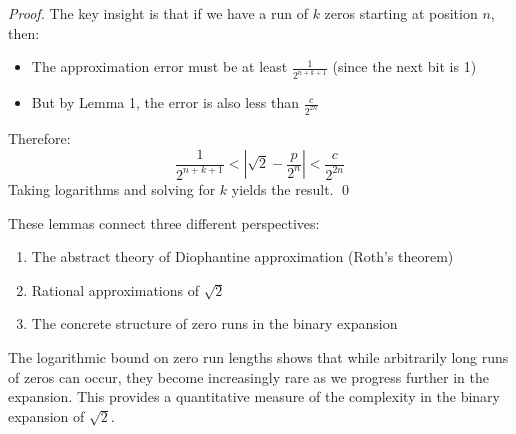 \textit{Proof.} The key insight is that if we have a run of $k$ zeros starting at position $n$, then:
\begin{itemize}
    \item The approximation error must be at least $\frac{1}{2^{n+k+1}}$ (since the next bit is 1)
    \item But by Lemma 1, the error is also less than $\frac{c}{2^{2n}}$
\end{itemize}
Therefore:
\[
\frac{1}{2^{n+k+1}} < \left|\sqrt{2} - \frac{p}{2^n}\right| < \frac{c}{2^{2n}}
\]
Taking logarithms and solving for $k$ yields the result. \qed

These lemmas connect three different perspectives:
\begin{enumerate}
    \item The abstract theory of Diophantine approximation (Roth's theorem)
    \item Rational approximations of $\sqrt{2}$
    \item The concrete structure of zero runs in the binary expansion
\end{enumerate}

The logarithmic bound on zero run lengths shows that while arbitrarily long runs of zeros can occur, they become increasingly rare as we progress further in the expansion. This provides a quantitative measure of the complexity in the binary expansion of $\sqrt{2}$.
